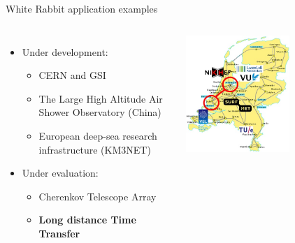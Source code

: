 \documentclass[compress, red]{beamer}
\begin{document}
\begin{frame}{White Rabbit application examples}
\begin{columns}[c]
    \begin{itemize}
      \item Under development:
      \begin{itemize}
	\item CERN and GSI
	\item The Large High Altitude Air Shower Observatory (China)
	\item European deep-sea research infrastructure (KM3NET) 
      \end{itemize}         	
      \item Under evaluation:
      \begin{itemize}
	\item Cherenkov Telescope Array
	\item \textbf{Long distance Time Transfer}
      \end{itemize}         	
    \end{itemize}    
    \begin{center}
      \includegraphics[width=0.6\textwidth]{applications/netherlands.jpg}
      \end{center}
\end{columns}
\end{frame}
\end{document}
